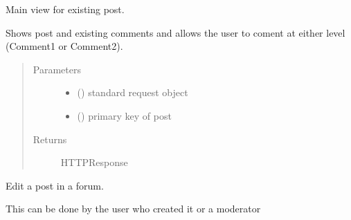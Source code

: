\documentclass[letterpaper,10pt,english]{sphinxmanual}
\begin{document}

\begin{fulllineitems}
\label{\detokenize{forums:forums.views.post_detail}}
Main view for existing post.

Shows post and existing comments and allows the user to coment at either
level (Comment1 or Comment2).
\begin{quote}\begin{description}
\item[{Parameters}] \leavevmode\begin{itemize}
\item {} 
 () \textendash{} standard request object

\item {} 
 () \textendash{} primary key of post

\end{itemize}

\item[{Returns}] \leavevmode
HTTPResponse

\end{description}\end{quote}

\end{fulllineitems}


\begin{fulllineitems}
\label{\detokenize{forums:forums.views.post_edit}}
Edit a post in a forum.

This can be done by the user who created it or a moderator

\end{fulllineitems}

\end{document}
